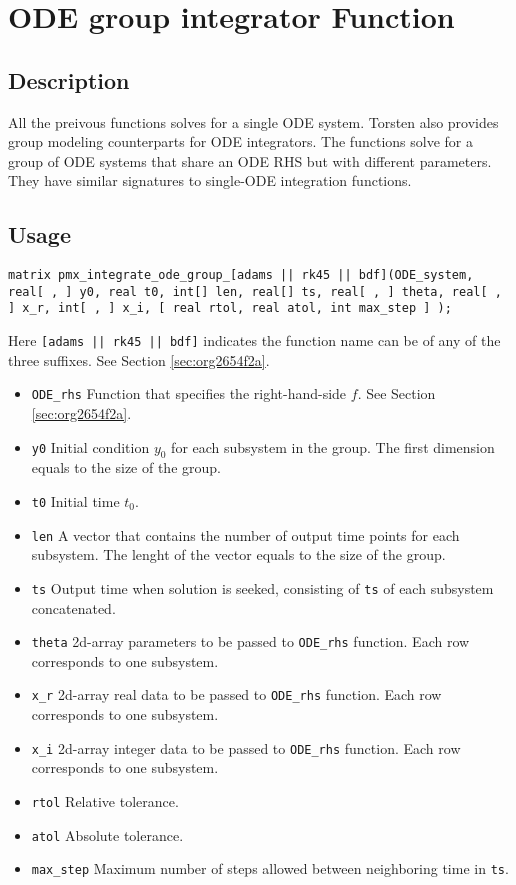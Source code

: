 \documentclass[12pt, reqno, oneside]{amsbook}
\numberwithin{equation}{chapter}
\numberwithin{figure}{chapter}
\numberwithin{table}{chapter}
\theoremstyle{remark}
\begin{document}
\section{ODE group  integrator Function}
\label{sec:orge34552c}
\subsection{Description}
\label{sec:org1905897}
All the preivous functions solves for a single ODE system. Torsten also
provides group modeling counterparts for ODE integrators. The
functions solve for a group of ODE systems that share an ODE RHS but with
different parameters. They have similar
signatures to single-ODE integration functions.
\subsection{Usage}
\label{sec:orgdd1fe48}
\begin{verbatim}
matrix pmx_integrate_ode_group_[adams || rk45 || bdf](ODE_system, real[ , ] y0, real t0, int[] len, real[] ts, real[ , ] theta, real[ , ] x_r, int[ , ] x_i, [ real rtol, real atol, int max_step ] );
\end{verbatim}
Here \texttt{[adams || rk45 || bdf]} indicates the
function name can be of any of the three suffixes. See Section \ref{sec:org2654f2a}.
\begin{itemize}
\item \texttt{ODE\_rhs}
Function that specifies the right-hand-side \(f\). See Section \ref{sec:org2654f2a}.
\item \texttt{y0}
Initial condition \(y_0\) for each subsystem in the group. The
first dimension equals to the size of the group.
\item \texttt{t0}
Initial time \(t_0\).
\item \texttt{len}
A vector that contains the number of output time points for each
subsystem. The lenght of the vector equals to the size of the group.
\item \texttt{ts}
Output time when solution is seeked, consisting of
\texttt{ts} of each subsystem concatenated.
\item \texttt{theta}
2d-array parameters to be passed to \texttt{ODE\_rhs}
function. Each row corresponds to one subsystem.
\item \texttt{x\_r}
2d-array real data to be passed to \texttt{ODE\_rhs} function.
Each row corresponds to one subsystem.
\item \texttt{x\_i}
2d-array integer data to be passed to \texttt{ODE\_rhs} function.
Each row corresponds to one subsystem.
\item \texttt{rtol}
Relative tolerance.
\item \texttt{atol}
Absolute tolerance.
\item \texttt{max\_step}
Maximum number of steps allowed between neighboring time in \texttt{ts}.
\end{itemize}
\end{document}
